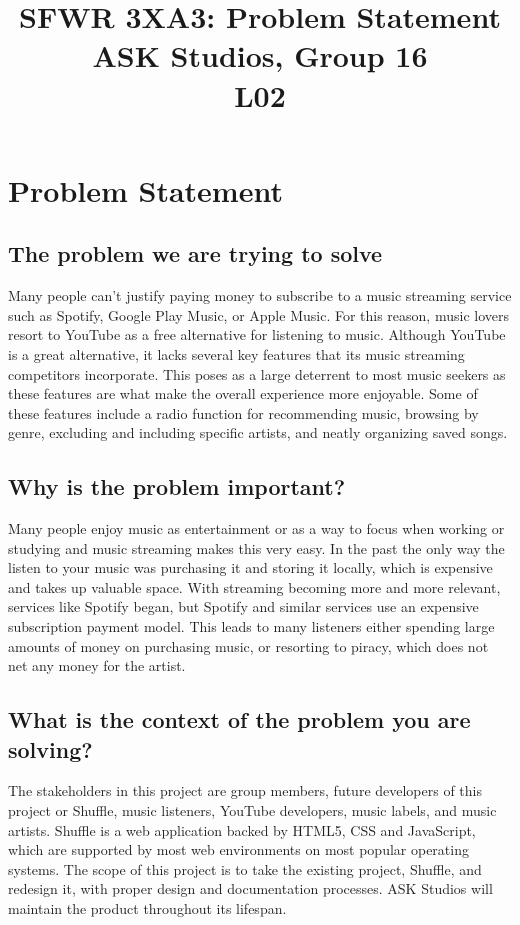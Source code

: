 \documentclass[12pt, a4paper]{article}
\title{}
\title{%
  SFWR 3XA3: Problem Statement \\
  \hfill \break
  \large ASK Studios, Group 16 \\
    L02}
\begin{document}
\maketitle
\section{Problem Statement}
\subsection{The problem we are trying to solve}
Many people can't justify paying money to subscribe to a music streaming service such as Spotify, Google Play Music, or Apple Music. For this reason, music lovers resort to YouTube as a free alternative for listening to music. Although YouTube is a great alternative, it lacks several key features that its music streaming competitors incorporate. This poses as a large deterrent to most music seekers as these features are what make the overall experience more enjoyable. Some of these features include a radio function for recommending music, browsing by genre, excluding and including specific artists, and neatly organizing saved songs.
\subsection{Why is the problem important?}
Many people enjoy music as entertainment or as a way to focus when working or studying and music streaming makes this very easy. In the past the only way the listen to your music was purchasing it and storing it locally, which is expensive and takes up valuable space.  With streaming becoming more and more relevant, services like Spotify began, but Spotify and similar services use an expensive subscription payment model.  This leads to many listeners either spending large amounts of money on purchasing music, or resorting to piracy, which does not net any money for the artist.
\subsection{What is the context of the problem you are solving?}
The stakeholders in this project are group members, future developers of this project or Shuffle, music listeners, YouTube developers, music labels, and music artists.  Shuffle is a web application backed by HTML5, CSS and JavaScript, which are supported by most web environments on most popular operating systems.  The scope of this project is to take the existing project, Shuffle, and redesign it, with proper design and documentation processes.  ASK Studios will maintain the product throughout its lifespan.
\end{document}
